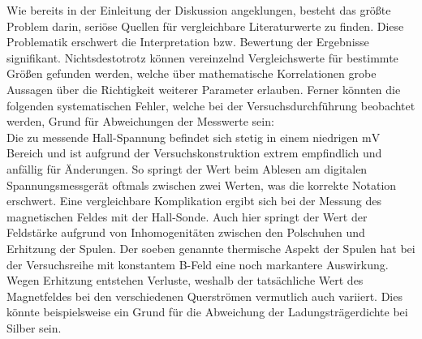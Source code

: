 \noindent Wie bereits in der Einleitung der Diskussion angeklungen, besteht das größte Problem darin, seriöse 
Quellen für vergleichbare Literaturwerte zu finden. Diese Problematik erschwert die Interpretation bzw. Bewertung 
der Ergebnisse signifikant. Nichtsdestotrotz können vereinzelnd Vergleichswerte für bestimmte Größen gefunden werden, 
welche über mathematische Korrelationen grobe Aussagen über die Richtigkeit weiterer Parameter erlauben. Ferner 
könnten die folgenden systematischen Fehler, welche bei der Versuchsdurchführung beobachtet werden, Grund für 
Abweichungen der Messwerte sein:\\

\noindent Die zu messende Hall-Spannung befindet sich stetig in einem niedrigen $\unit{\milli\volt}$ Bereich und ist 
aufgrund der Versuchskonstruktion extrem empfindlich und anfällig für Änderungen. So springt der Wert beim Ablesen am 
digitalen Spannungsmessgerät oftmals zwischen zwei Werten, was die korrekte Notation erschwert. Eine vergleichbare Komplikation 
ergibt sich bei der Messung des magnetischen Feldes mit der Hall-Sonde. Auch hier springt der Wert der Feldstärke 
aufgrund von Inhomogenitäten zwischen den Polschuhen und Erhitzung der Spulen. Der soeben genannte thermische Aspekt 
der Spulen hat bei der Versuchsreihe mit konstantem B-Feld eine noch markantere Auswirkung. Wegen Erhitzung entstehen 
Verluste, weshalb der tatsächliche Wert des Magnetfeldes bei den verschiedenen Querströmen vermutlich auch variiert.
Dies könnte beispielsweise ein Grund für die Abweichung der Ladungsträgerdichte bei Silber sein.  

%










